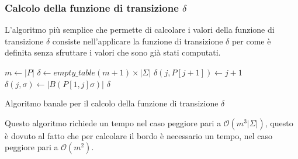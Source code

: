 \subsubsection{Calcolo della funzione di transizione $\delta$}
L'algoritmo più semplice che permette di calcolare i valori della funzione di
transizione $\delta$ consiste nell'applicare la funzione di transizione $\delta$
per come è definita senza sfruttare i valori che sono già stati computati.
\begin{algorithm}
    \begin{algorithmic}
        \State $m \gets |P|$
        \State $\delta \gets empty\_table (m + 1) \times | \Sigma|$
        \State $\delta(j, P[j + 1]) \gets j + 1$
        \EndFor
        \For{$\sigma \in \Sigma$}
        \State $\delta(j, \sigma) \gets |B(P[1, j]\sigma)|$
        \EndFor
        \EndFor
        \State \Return $\delta$
        \EndFunction
    \end{algorithmic}
    \caption{Algoritmo banale per il calcolo della funzione di transizione $\delta$}
\end{algorithm}

Questo algoritmo richiede un tempo nel caso peggiore pari a $\mathcal{O}(m^3
    |\Sigma|)$, questo è dovuto al fatto che per calcolare il bordo è necessario
un tempo, nel caso peggiore pari a $\mathcal{O}(m^2)$.

